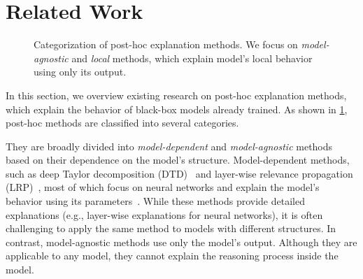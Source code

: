 \documentclass[runningheads]{llncs}
\begin{document}
{\section{Related Work}\label{sec:related-work}
\begin{figure}[tbp]
  \centering
  \def\w{2.5}
  \def\ww{5.0}
  \def\h{0.5}
  \def\hh{1.3}
  \def\hhh{1.8}
  \def\hhhh{2.6}
  \caption{%
    Categorization of post-hoc explanation methods.
    We focus on \emph{model-agnostic} and \emph{local} methods,
    which explain model's local behavior using only its output.
  }\label{fig:post-hoc}
\end{figure}
In this section,
we overview existing research on post-hoc explanation methods,
which explain the behavior of black-box models already trained.
As shown in \cref{fig:post-hoc},
post-hoc methods are classified into several categories.

They are broadly divided into
\emph{model-dependent} and \emph{model-agnostic} methods
based on their dependence on the model's structure.
Model-dependent methods,
such as deep Taylor decomposition (DTD)~\cite{montavon2017explaining}
and layer-wise relevance propagation (LRP)~\cite{bach2015pixel},
most of which focus on neural networks and
explain the model's behavior using its parameters~\cite{samek2021explaining}.
While these methods provide detailed explanations
(e.g., layer-wise explanations for neural networks),
it is often challenging
to apply the same method to models with different structures.
In contrast,
model-agnostic methods use only the model's output.
Although they are applicable to any model,
they cannot explain the reasoning process inside the model.

}
\end{document}
